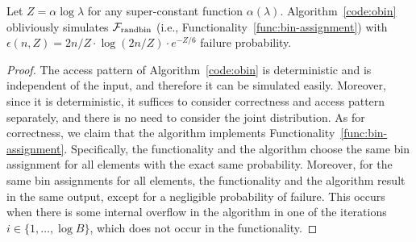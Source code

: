 \begin{lemma}
Let $Z = \alpha \log \lambda$ for any super-constant function $\alpha(\lambda)$.
Algorithm~\ref{code:obin}
obliviously simulates ${\cal F}_{\rm randbin}$ (i.e., Functionality~\ref{func:bin-assignment}) with $\epsilon(n, Z) = 2n/Z \cdot \log(2n/Z) \cdot e^{-Z/6}$ failure probability. %
\label{lem:randbin}
\end{lemma}
\begin{proof}
The access pattern of Algorithm~\ref{code:obin} is deterministic and is independent of the input, and therefore it can be simulated easily. Moreover, since it is deterministic, it suffices to consider correctness and access pattern separately, and there is no need to consider the joint distribution. 
As for correctness, we claim that the algorithm implements Functionality~\ref{func:bin-assignment}. Specifically, the functionality and the algorithm choose the same bin assignment for all elements with the exact same probability. Moreover, for the same bin assignments for all elements, the functionality and the algorithm result in the same output, except for a negligible probability of failure. This occurs when there is some internal overflow in the algorithm in one of the iterations $i \in \{1,\ldots,\log B\}$, which does not occur in the functionality. 
\end{proof}
%
%
